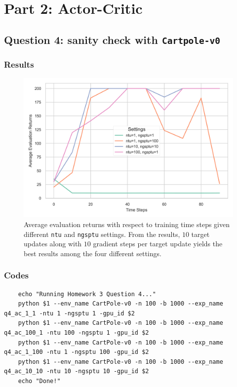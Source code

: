 \documentclass[10pt, letterpaper]{article}
\begin{document}

\newpage
\section{Part 2: Actor-Critic}

\subsection*{Question 4: sanity check with \texttt{Cartpole-v0}}
\subsubsection*{Results}
\begin{figure}[thbp]
    \centering
    \includegraphics[width=\textwidth]{img/q4.png}
    \caption{Average evaluation returns with respect to training time steps given different \texttt{ntu} and \texttt{ngsptu} settings. From the results, $10$ target updates along with $10$ gradient steps per target update yields the best results among the four different settings.}
    \label{fig:4}
\end{figure}
\subsubsection*{Codes}
\begin{lstlisting}
    echo "Running Homework 3 Question 4..."
    python $1 --env_name CartPole-v0 -n 100 -b 1000 --exp_name q4_ac_1_1 -ntu 1 -ngsptu 1 -gpu_id $2
    python $1 --env_name CartPole-v0 -n 100 -b 1000 --exp_name q4_ac_100_1 -ntu 100 -ngsptu 1 -gpu_id $2
    python $1 --env_name CartPole-v0 -n 100 -b 1000 --exp_name q4_ac_1_100 -ntu 1 -ngsptu 100 -gpu_id $2
    python $1 --env_name CartPole-v0 -n 100 -b 1000 --exp_name q4_ac_10_10 -ntu 10 -ngsptu 10 -gpu_id $2
    echo "Done!"
\end{lstlisting}
\end{document}
